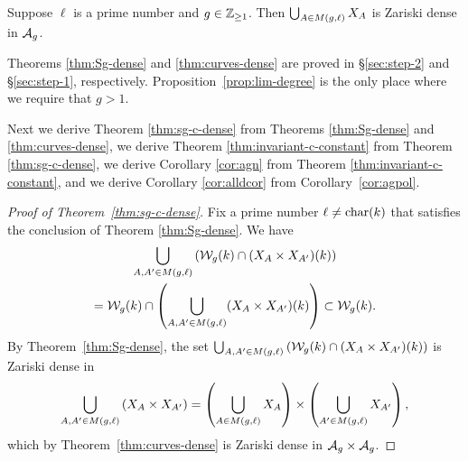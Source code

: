 \documentclass{amsart}
\begin{document}
\begin{theorem}\label{thm:curves-dense}
    Suppose $\ell$ is a prime number and $g\in\mathbb{Z}_{\ge 1}$. Then $\bigcup_{A \in M(g,\ell)} X_A$ is Zariski dense in $\mathcal{A}_g$.
\end{theorem}

Theorems \ref{thm:Sg-dense} and \ref{thm:curves-dense} are proved in \S\ref{sec:step-2} and \S\ref{sec:step-1}, respectively. Proposition~\ref{prop:lim-degree} is the only place where we require that $g > 1$.

Next we derive Theorem \ref{thm:sg-c-dense} from Theorems \ref{thm:Sg-dense} and \ref{thm:curves-dense},  we derive Theorem \ref{thm:invariant-c-constant} from Theorem \ref{thm:sg-c-dense},  we derive Corollary \ref{cor:agn} from Theorem \ref{thm:invariant-c-constant}, and we derive Corollary \ref{cor:alldcor} from Corollary~\ref{cor:agpol}.

\begin{proof}[Proof of Theorem~\ref{thm:sg-c-dense}]
Fix a prime number $\ell\neq\operatorname{char}(k)$ that satisfies the conclusion of Theorem \ref{thm:Sg-dense}. We have
\begin{multline*}
\bigcup_{A,A' \in M(g,\ell)} \left(\mathcal{W}_g(k) \cap (X_A \times X_{A'})(k)\right) \\
 =  \mathcal{W}_g(k) \cap \left(\bigcup_{A,A' \in M(g,\ell)} (X_A \times X_{A'})(k)\right)
   \subset \mathcal{W}_g(k).
\end{multline*}
By Theorem~\ref{thm:Sg-dense}, the set
$\bigcup_{A,A' \in M(g,\ell)} \left(\mathcal{W}_g(k) \cap (X_A \times X_{A'})(k)\right)$ is Zariski dense in
$$
\bigcup_{A,A' \in M(g,\ell)} \left(X_A \times X_{A'}\right) =
    \left(\bigcup_{A \in M(g,\ell)} X_A\right) \times \left(\bigcup_{A' \in M(g,\ell)} X_{A'}\right),
    $$
    which by Theorem~\ref{thm:curves-dense} is Zariski dense in $\mathcal{A}_g \times \mathcal{A}_g$.
\end{proof}
\end{document}
